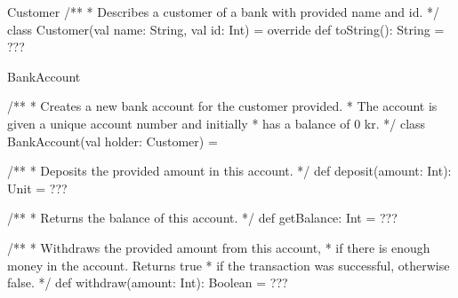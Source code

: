 \begin{ScalaSpec}{Customer}
/**
 * Describes a customer of a bank with provided name and id.
 */
class Customer(val name: String, val id: Int) = {
	override def toString(): String = ???
}

\end{ScalaSpec}


\begin{ScalaSpec}{BankAccount}

/**
 * Creates a new bank account for the customer provided.
 * The account is given a unique account number and initially
 * has a balance of 0 kr.
 */
class BankAccount(val holder: Customer) = {

  /**
   * Deposits the provided amount in this account.
   */
  def deposit(amount: Int): Unit = ???

  /**
   * Returns the balance of this account.
   */
  def getBalance: Int = ???

  /**
   * Withdraws the provided amount from this account,
   * if there is enough money in the account. Returns true
   * if the transaction was successful, otherwise false.
   */
  def withdraw(amount: Int): Boolean = ???

}
\end{ScalaSpec}


